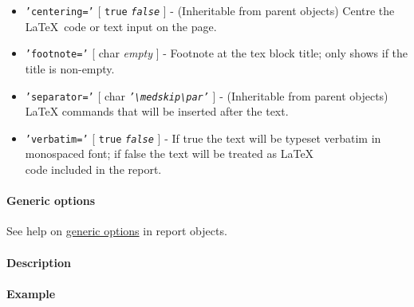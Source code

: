 \begin{itemize}
\item
  \texttt{'centering='} {[} \texttt{true} \textbar{}
  \emph{\texttt{false}} {]} - (Inheritable from parent objects) Centre
  the \LaTeX~code or text input on the page.
\item
  \texttt{'footnote='} {[} char \textbar{} \emph{empty} {]} - Footnote
  at the tex block title; only shows if the title is non-empty.
\item
  \texttt{'separator='} {[} char \textbar{}
  \emph{\texttt{'\textbackslash{}medskip\textbackslash{}par'}} {]} -
  (Inheritable from parent objects) LaTeX commands that will be inserted
  after the text.
\item
  \texttt{'verbatim='} {[} \texttt{true} \textbar{}
  \emph{\texttt{false}} {]} - If true the text will be typeset verbatim
  in monospaced font; if false the text will be treated as \LaTeX\\code
  included in the report.
\end{itemize}

\paragraph{Generic options}\label{generic-options}

See help on \href{report/Contents}{generic options} in report objects.

\paragraph{Description}\label{description}

\paragraph{Example}\label{example}


